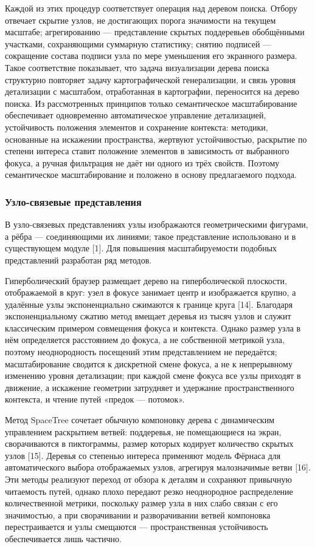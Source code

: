 Каждой из этих процедур соответствует операция над деревом поиска. Отбору отвечает скрытие узлов, не достигающих порога значимости на текущем масштабе; агрегированию — представление скрытых поддеревьев обобщёнными участками, сохраняющими суммарную статистику; снятию подписей — сокращение состава подписи узла по мере уменьшения его экранного размера. Такое соответствие показывает, что задача визуализации дерева поиска структурно повторяет задачу картографической генерализации, и связь уровня детализации с масштабом, отработанная в картографии, переносится на дерево поиска. Из рассмотренных принципов только семантическое масштабирование обеспечивает одновременно автоматическое управление детализацией, устойчивость положения элементов и сохранение контекста: методики, основанные на искажении пространства, жертвуют устойчивостью, раскрытие по степени интереса ставит положение элементов в зависимость от выбранного фокуса, а ручная фильтрация не даёт ни одного из трёх свойств. Поэтому семантическое масштабирование и положено в основу предлагаемого подхода.

\subsubsection{Узло-связевые представления}

В узло-связевых представлениях узлы изображаются геометрическими фигурами, а рёбра — соединяющими их линиями; такое представление использовано и в существующем модуле [1]. Для повышения масштабируемости подобных представлений разработан ряд методов.

Гиперболический браузер размещает дерево на гиперболической плоскости, отображаемой в круг: узел в фокусе занимает центр и изображается крупно, а удалённые узлы экспоненциально сжимаются к границе круга [14]. Благодаря экспоненциальному сжатию метод вмещает деревья из тысяч узлов и служит классическим примером совмещения фокуса и контекста. Однако размер узла в нём определяется расстоянием до фокуса, а не собственной метрикой узла, поэтому неоднородность посещений этим представлением не передаётся; масштабирование сводится к дискретной смене фокуса, а не к непрерывному изменению уровня детализации; при каждой смене фокуса все узлы приходят в движение, а искажение геометрии затрудняет и удержание пространственного контекста, и чтение путей «предок — потомок».

Метод SpaceTree сочетает обычную компоновку дерева с динамическим управлением раскрытием ветвей: поддеревья, не помещающиеся на экран, сворачиваются в пиктограммы, размер которых кодирует количество скрытых узлов [15]. Деревья со степенью интереса применяют модель Фёрнаса для автоматического выбора отображаемых узлов, агрегируя малозначимые ветви [16]. Эти методы реализуют переход от обзора к деталям и сохраняют привычную читаемость путей, однако плохо передают резко неоднородное распределение количественной метрики, поскольку размер узла в них слабо связан с его значимостью, а при сворачивании и разворачивании ветвей компоновка перестраивается и узлы смещаются — пространственная устойчивость обеспечивается лишь частично.

